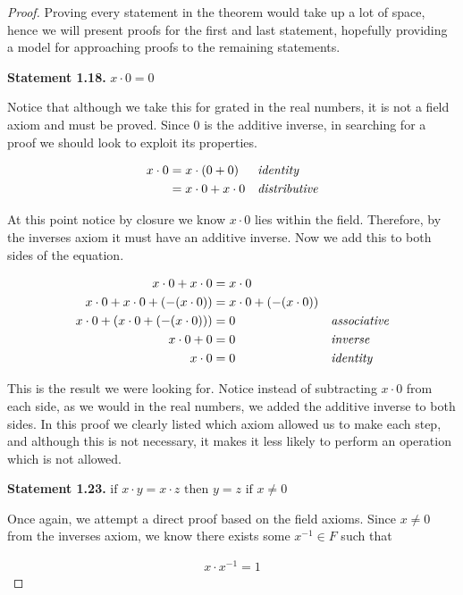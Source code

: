\documentclass[twoside]{report}
\newcommand{\header}[2]{\begin{flushright} \textbf{#1} #2 \end{flushright}}
\begin{document}
\begin{proof}
	Proving every statement in the theorem would take up a lot of space, hence we will present proofs for the first and last statement, hopefully providing a model for approaching proofs to the remaining statements.
	
	\header{Statement 1.18. }{$x \cdot 0 = 0$}
	
	Notice that although we take this for grated in the real numbers, it is not a field axiom and must be proved. Since 0 is the additive inverse, in searching for a proof we should look to exploit its properties.

	\begin{align*}
		x \cdot 0 &= x \cdot (0 + 0) &&\emph{identity} \\
		&= x \cdot 0 + x \cdot 0 &&\emph{distributive}
	\end{align*}
	
	At this point notice by closure we know $x \cdot 0$ lies within the field. Therefore, by the inverses axiom it must have an additive inverse. Now we add this to both sides of the equation.
	
	\begin{align*}
		x \cdot 0 + x \cdot 0 &= x \cdot 0 && \\
		x \cdot 0 + x \cdot 0 + (-(x \cdot 0)) &= x \cdot 0 + (-(x \cdot 0)) && \\
		x \cdot 0 + (x \cdot 0 + (-(x \cdot 0))) &= 0  &&\emph{associative} \\
		x \cdot 0 + 0 &= 0 &&\emph{inverse} \\
		x \cdot 0 &= 0 &&\emph{identity}
	\end{align*}
	
	This is the result we were looking for. Notice instead of subtracting $x \cdot 0$ from each side, as we would in the real numbers, we added the additive inverse to  both sides. In this proof we clearly listed which axiom allowed us to make each step, and although this is not necessary, it makes it less likely to perform an operation which is not allowed.
	
	\header{Statement 1.23. }{$\text{if } x \cdot y = x \cdot z \text{ then } y = z \text { if } x \neq 0$}
	
	Once again, we attempt a direct proof based on the field axioms. Since $x \neq 0$ from the inverses axiom, we know there exists some $x^{-1} \in F$ such that
	
	\begin{align*}
		x \cdot x^{-1} = 1
	\end{align*}
	

\end{proof}
\end{document}
